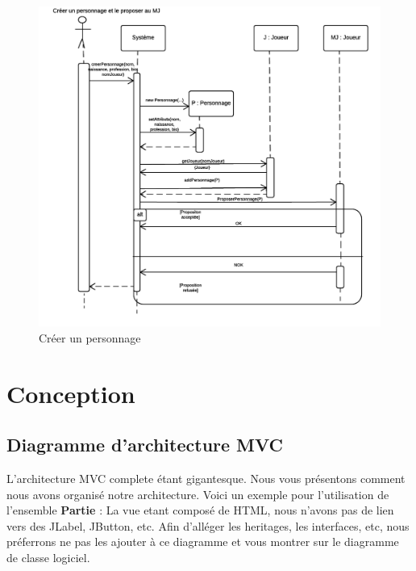 \documentclass[a4paper,oneside,10pt]{article}
\begin{document}
\begin{figure}[H]
	\begin{center}
		\includegraphics[width=12cm]{images/sequence/DS-CreerPerso.png}  
		\caption{Créer un personnage}
	\end{center}
\end{figure}


\pagebreak

\section{Conception}


\subsection{Diagramme d'architecture MVC}

L'architecture MVC complete étant gigantesque. Nous vous présentons comment nous avons organisé notre architecture. 
Voici un exemple pour l'utilisation de l'ensemble \textbf{Partie} :
La vue etant composé de HTML, nous n'avons pas de lien vers des JLabel, JButton, etc. 
Afin d'alléger les heritages, les interfaces, etc, nous préferrons ne pas les ajouter à ce diagramme et vous montrer sur le diagramme de classe logiciel. 
\end{document}
